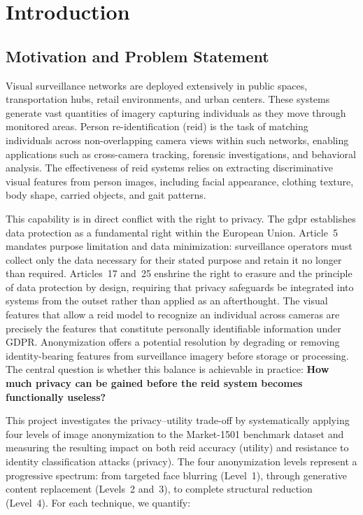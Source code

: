 \chapter{Introduction}

\section{Motivation and Problem Statement}

Visual surveillance networks are deployed extensively in public spaces, transportation hubs, retail environments, and urban centers. These systems generate vast quantities of imagery capturing individuals as they move through monitored areas. Person re-identification (\acrshort{reid}) is the task of matching individuals across non-overlapping camera views within such networks, enabling applications such as cross-camera tracking, forensic investigations, and behavioral analysis. The effectiveness of \acrshort{reid} systems relies on extracting discriminative visual features from person images, including facial appearance, clothing texture, body shape, carried objects, and gait patterns.

This capability is in direct conflict with the right to privacy. The \acrlong{gdpr} \cite{gdpr2016} establishes data protection as a fundamental right within the European Union. Article~5 mandates purpose limitation and data minimization: surveillance operators must collect only the data necessary for their stated purpose and retain it no longer than required. Articles~17 and~25 enshrine the right to erasure and the principle of data protection by design, requiring that privacy safeguards be integrated into systems from the outset rather than applied as an afterthought. The visual features that allow a \acrshort{reid} model to recognize an individual across cameras are precisely the features that constitute personally identifiable information under GDPR. Anonymization offers a potential resolution by degrading or removing identity-bearing features from surveillance imagery before storage or processing. The central question is whether this balance is achievable in practice: \textbf{How much privacy can be gained before the \acrshort{reid} system becomes functionally useless?}

This project investigates the privacy--utility trade-off by systematically applying four levels of image anonymization to the Market-1501 benchmark dataset \cite{zheng2015market1501} and measuring the resulting impact on both \acrshort{reid} accuracy (utility) and resistance to identity classification attacks (privacy). The four anonymization levels represent a progressive spectrum: from targeted face blurring (Level~1), through generative content replacement (Levels~2 and~3), to complete structural reduction (Level~4). For each technique, we quantify:

